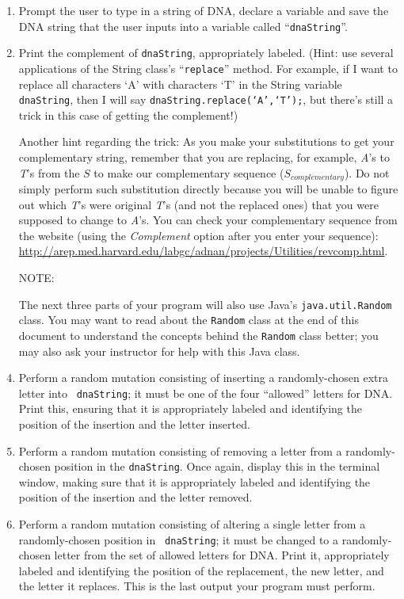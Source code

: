 \begin{enumerate}

\item Prompt the user to type in a string of DNA, declare a variable and save the DNA string that the user inputs into a
  variable called ``{\tt dnaString}''.

\item Print the complement of {\tt dnaString}, appropriately labeled.  (Hint: use several applications of the String
  class's ``{\tt replace}'' method. For example, if I want to replace all characters `A' with characters `T' in the
  String variable {\tt dnaString}, then I will say {\tt dnaString.replace(`A',`T');}, but there's still a trick in this
  case of getting the complement!)

Another hint regarding the trick: As you make your substitutions to get your complementary string, remember that you are
replacing, for example, \emph{A}'s to \emph{T}'s from the $S$ to make our complementary sequence ($S_{complementary}$).
Do not simply perform such substitution directly because you will be unable to figure out which \emph{T}'s were original
\emph{T}'s (and not the replaced ones) that you were supposed to change to \emph{A}'s. You can check your complementary
sequence from the website  (using the \emph{Complement} option after you enter your sequence): \url{http://arep.med.harvard.edu/labgc/adnan/projects/Utilities/revcomp.html}.

\item[NOTE:]

The next three parts of your program will also use Java's {\tt java.util.Random} class. You may want to read about the
{\tt Random} class at the end of this document to understand the concepts behind the {\tt Random} class better; you may
also ask your instructor for help with this Java class.

\item \begin{sloppypar} Perform a random mutation consisting of inserting a randomly-chosen extra letter into {\tt
  dnaString}; it must be one of the four ``allowed'' letters for DNA. Print this, ensuring that it is appropriately
labeled and identifying the position of the insertion and the letter inserted. \end{sloppypar}

\item Perform a random mutation consisting of removing a letter from a randomly-chosen position in the {\tt dnaString}.
  Once again, display this in the terminal window, making sure that it is appropriately labeled and identifying the
  position of the insertion and the letter removed.

\item Perform a random mutation consisting of altering a single letter from a randomly-chosen position in {\tt
  dnaString}; it must be changed to a randomly-chosen letter from the set of allowed letters for DNA. Print it,
  appropriately labeled and identifying the position of the replacement, the new letter, and the letter it replaces.
  This is the last output your program must perform.

\end{enumerate}

